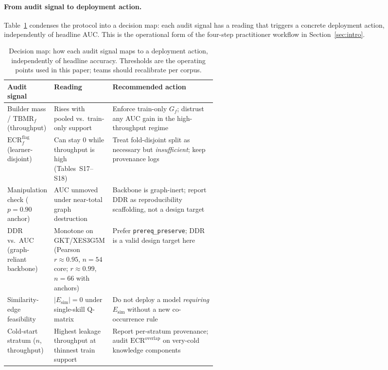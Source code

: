 \documentclass[pdflatex,sn-mathphys-num]{sn-jnl}
\newcommand{\Esim}{\ensuremath{E_{\text{sim}}}}
\newcommand{\KCs}{knowledge components}
\newcommand{\DDR}{\textsc{DDR}}
\begin{document}
\paragraph{From audit signal to deployment action.}
Table~\ref{tab:audit-actions} condenses the protocol into a decision map: each
audit signal has a reading that triggers a concrete deployment action,
independently of headline AUC. This is the operational form of the four-step
practitioner workflow in Section~\ref{sec:intro}.

\begin{table}[t]
\centering
\caption{Decision map: how each audit signal maps to a deployment action,
independently of headline accuracy. Thresholds are the operating points used in
this paper; teams should recalibrate per corpus.}
\label{tab:audit-actions}
\footnotesize
\setlength{\tabcolsep}{4pt}
\begin{tabularx}{\linewidth}{@{} >{\RaggedRight\arraybackslash}p{0.22\linewidth}
  >{\RaggedRight\arraybackslash}p{0.28\linewidth}
  >{\RaggedRight\arraybackslash}X @{}}
\toprule
Audit signal & Reading & Recommended action \\
\midrule
Builder mass / $\mathrm{TBMR}_f$ (throughput) & Rises with pooled vs.\ train-only
support & Enforce train-only $G_f$; distrust any AUC gain in the high-throughput
regime \\
$\mathrm{ECR}^{\mathrm{flag}}_f$ (learner-disjoint) & Can stay $0$ while
throughput is high (Tables~S17--S18) & Treat fold-disjoint split as necessary but
\emph{insufficient}; keep provenance logs \\
Manipulation check ($p{=}0.90$ anchor) & AUC unmoved under near-total graph
destruction & Backbone is graph-inert; report \DDR{} as reproducibility scaffolding,
not a design target \\
\DDR{} vs.\ AUC (graph-reliant backbone) & Monotone on GKT/XES3G5M
(Pearson $r{\approx}0.95$, $n{=}54$ core; $r{\approx}0.99$, $n{=}66$ with anchors)
& Prefer \texttt{prereq\_preserve}; \DDR{} is a valid design target here \\
Similarity-edge feasibility & $|E_{\mathrm{sim}}|{=}0$ under single-skill Q-matrix
& Do not deploy a model \emph{requiring} $\Esim$ without a new co-occurrence rule \\
Cold-start stratum ($n$, throughput) & Highest leakage throughput at thinnest
train support & Report per-stratum provenance; audit $\mathrm{ECR}^{\mathrm{overlap}}$
on very-cold \KCs{} \\
\bottomrule
\end{tabularx}
\end{table}
\end{document}

